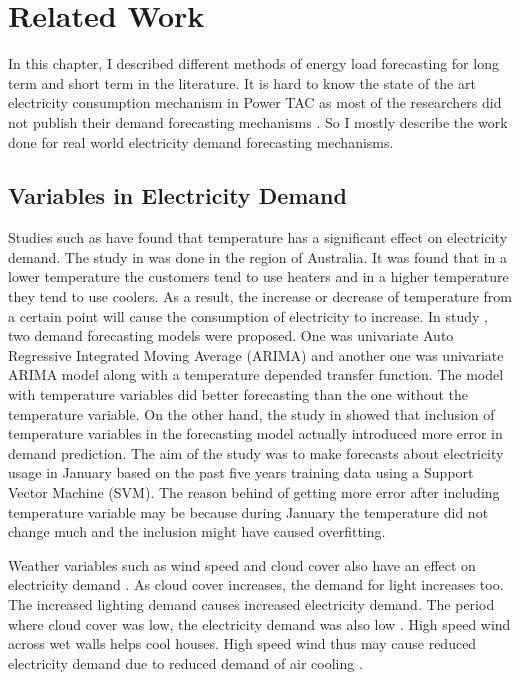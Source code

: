 
\chapter{Related Work}

In this chapter, I described different methods of energy load forecasting for long term and short term in the literature. It is hard to know the state of the art electricity consumption mechanism in Power TAC as most of the researchers did not publish their demand forecasting mechanisms \cite{liefers2014successful, ozdemir2015winner, serranofixing, ozdemir2015agentude}. So I mostly describe the work done for real world electricity demand forecasting mechanisms.   

\section{Variables in Electricity Demand}

Studies such as \cite{hor2005analyzing, hart2004weather, cho1995customer} have found that temperature has a significant effect on electricity demand. The study in \cite{hart2004weather} was done in the region of Australia.  It was found that in a lower temperature the customers tend to use heaters and in a higher temperature they tend to use coolers. As a result, the increase or decrease of temperature from a certain point will cause the consumption of electricity to increase. In study \cite{cho1995customer}, two demand forecasting models were proposed. One was univariate Auto Regressive Integrated Moving Average (ARIMA) and another one was univariate ARIMA model along with a temperature depended transfer function. The model with temperature variables did better forecasting than the one without the temperature variable. On the other hand, the study in  \cite{chen2004load} showed that inclusion of temperature variables in the forecasting model actually introduced more error in demand prediction. The aim of the study was to make forecasts about electricity usage in January based on the past five years training data using a Support Vector Machine (SVM). The reason behind of getting more error after including temperature variable may be because during January the temperature did not change much and the inclusion might have caused overfitting. 

Weather variables such as  wind speed and cloud cover also have an effect on electricity demand \cite{hor2005analyzing, rudenauer2004energy}. As cloud cover increases, the demand for light increases too. The increased lighting demand causes increased electricity demand. The period where cloud cover was low, the electricity demand was also low \cite{hor2005analyzing}. High speed wind across wet walls helps cool houses. High speed wind thus may cause reduced electricity demand due to reduced demand of air cooling \cite{rudenauer2004energy}. 


